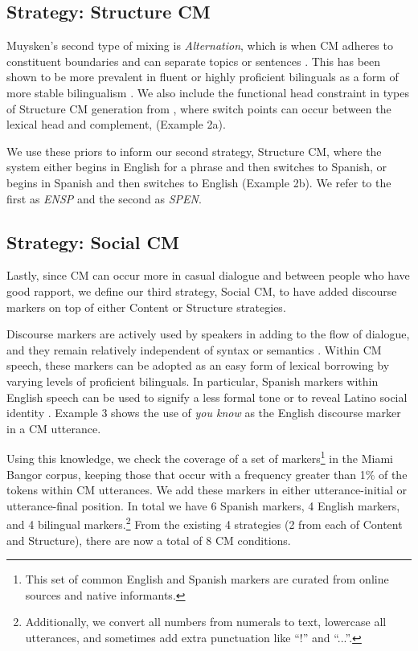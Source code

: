 \documentclass[11pt,a4paper]{article}
\begin{document}
\subsection{Strategy: Structure CM}

Muysken's second type of mixing is \textit{Alternation}, which is when CM adheres to constituent boundaries \citep{sankoff1981formal} and can separate topics or sentences \citep{Ardila2005}. 
This has been shown to be more prevalent in fluent or highly proficient bilinguals as a form of more stable bilingualism \citep{Deuchar2007}. 
We also include the functional head constraint in types of Structure CM generation from \citet{Belazi1994}, where switch points can occur between the lexical head and complement, (Example 2a).

We use these priors to inform our second strategy, Structure CM, where the system either begins in English for a phrase and then switches to Spanish, or begins in Spanish and then switches to English (Example 2b). 
We refer to the first as \textit{EN\textrightarrow SP} and the second as \textit{SP\textrightarrow EN}.

\subsection{Strategy: Social CM}

Lastly, since CM can occur more in casual dialogue and between people who have good rapport, we define our third strategy, Social CM, to have added discourse markers on top of either Content or Structure strategies.

Discourse markers are actively used by speakers in adding to the flow of dialogue, and they remain relatively independent of syntax or semantics \citep{schiffrin1988discourse}.
Within CM speech, these markers can be adopted as an easy form of lexical borrowing by varying levels of proficient bilinguals.
In particular, Spanish markers within English speech can be used to signify a less formal tone or to reveal Latino social identity \citep{Torres2011}.
Example 3 shows the use of \textit{you know} as the English discourse marker in a CM utterance.

Using this knowledge, we check the coverage of a set of markers\footnote{This set of common English and Spanish markers are curated from online sources and native informants.} in the Miami Bangor corpus, keeping those that occur with a frequency greater than 1\% of the tokens within CM utterances. 
We add these markers in either utterance-initial or utterance-final position.
In total we have 6 Spanish markers, 4 English markers, and 4 bilingual markers.\footnote{Additionally, we convert all numbers from numerals to text, lowercase all utterances, and sometimes add extra punctuation like ``!'' and ``...''.}
From the existing 4 strategies (2 from each of Content and Structure), there are now a total of 8 CM conditions.
\end{document}
